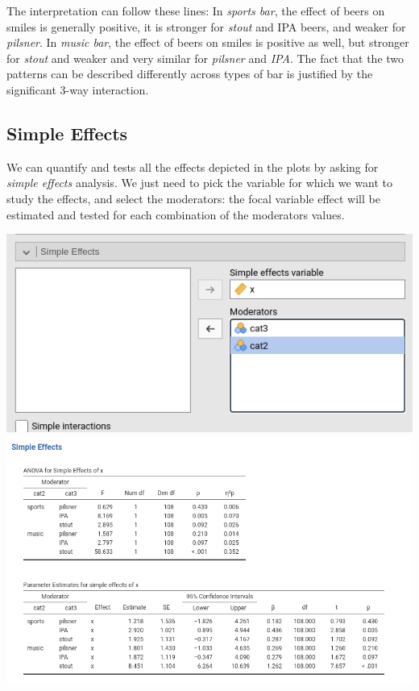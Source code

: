 \documentclass[
]{book}
\begin{document}
The interpretation can follow these lines: In \emph{sports bar}, the effect of beers on smiles is generally positive, it is stronger for \emph{stout} and IPA beers, and weaker for \emph{pilsner}. In \emph{music bar}, the effect of beers on smiles is positive as well, but stronger for \emph{stout} and weaker and very similar for \emph{pilsner} and \emph{IPA}. The fact that the two patterns can be described differently across types of bar is justified by the significant 3-way interaction.

\hypertarget{simple-effects}{%
\subsection{Simple Effects}\label{simple-effects}}

We can quantify and tests all the effects depicted in the plots by asking for \emph{simple effects} analysis. We just need to pick the variable for which we want to study the effects, and select the moderators: the focal variable effect will be estimated and tested for each combination of the moderators values.

\includegraphics{bookletpics/2_ancova_input5.png}
\includegraphics{bookletpics/2_ancova_output5.png}
\end{document}
